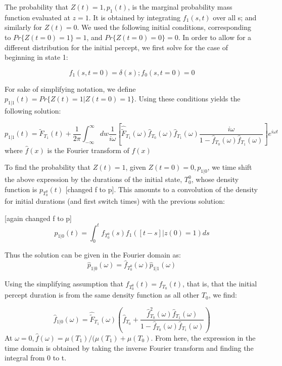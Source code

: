The probability that $Z(t)=1, p_1(t)$, is the marginal probability mass function evaluated at $z=1$. It is obtained by integrating $f_1(s,t)$ over all s; and similarly for $Z(t)=0$.
We used the following initial conditions, corresponding to $Pr \lbrace Z(t=0)=1 \rbrace=1$, and $Pr \lbrace Z(t=0)=0 \rbrace = 0$. In order to allow for a different distribution for the initial percept, we first solve for the case of beginning in state 1:

\begin{equation}
f_1(s,t=0) = \delta(s); f_0(s,t=0) = 0
\end{equation} 

For sake of simplifying notation, we define $p_{1|1}(t)=Pr \lbrace Z(t)=1|Z(t=0)=1 \rbrace$. Using these conditions yields the following solution:

\begin{equation}
p_{1|1}(t) = \tilde{F}_{T_1}(t) + \frac{1}{2\pi} \int_{-\infty}^\infty dw \frac{1}{i\omega} \left[ \hat{\tilde{F}}_{T_1}(\omega) \hat{f}_{T_0}(\omega)\hat{f}_{T_1}(\omega) \frac{i\omega}{1 - \hat{f}_{T_0}(\omega)\hat{f}_{T_1}(\omega)} \right] e^{i \omega t}
\end{equation}
where $\hat{f}(x)$ is the Fourier transform of $f(x)$

To find the probability that $Z(t)=1$, given $Z(t=0)=0, p_{1|0}$, we time shift the above expression by the durations of the initial state, $T_0^0$, whose density function is $p_{T_0^0}(t)$ [changed f to p]. This amounts to a convolution of the density for initial durations (and first switch times) with the previous solution:

[again changed f to p]
\begin{equation}
p_{1|0}(t) = \int_0^t f_{T_0^0}(s) f_{1}([t-s]|z(0)=1) ds
\end{equation}

Thus the solution can be given in the Fourier domain as:
\begin{equation}
\hat{p}_{1|0}(\omega) = \hat{f}_{T_0^0}(\omega) \hat{p}_{1|1} (\omega)
\end{equation}

Using the simplifying assumption that ${f}_{T_0^0}(t) = {f}_{T_0}(t)$, that is, that the initial percept duration is from the same density function as all other $T_0$, we find:
 
\begin{equation}
\hat{f}_{1|0}(\omega) = \hat{\tilde{F}}_{T_1}(\omega)
\left( \hat{f}_{T_0} + \frac{\hat{f}_{T_0}^2(\omega)\hat{f}_{T_1}(\omega)}{1-\hat{f}_{T_0}(\omega)\hat{f}_{T_1}(\omega)}\right)
\end{equation}
At $\omega = 0, \hat{f}(\omega) = \mu(T_1) / (\mu(T_1) + \mu(T_0)$. From here, the expression in the time domain is obtained by taking the inverse Fourier transform and finding the integral from 0 to t.  

